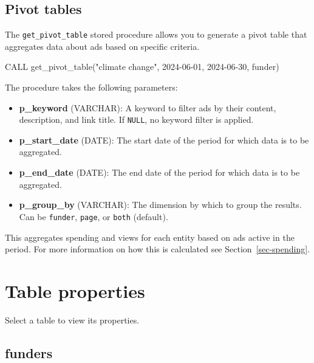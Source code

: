 \documentclass[
  letterpaper,
  DIV=11,
  numbers=noendperiod]{scrreprt}
\newenvironment{Shaded}{\begin{snugshade}}{\end{snugshade}}
\newcommand{\KeywordTok}[1]{\textcolor[rgb]{0.00,0.23,0.31}{#1}}
\newcommand{\NormalTok}[1]{\textcolor[rgb]{0.00,0.23,0.31}{#1}}
\newcommand{\StringTok}[1]{\textcolor[rgb]{0.13,0.47,0.30}{#1}}
\providecommand{\tightlist}{%
  \setlength{\itemsep}{0pt}\setlength{\parskip}{0pt}}\usepackage{longtable,booktabs,array}
\begin{document}
\subsection{Pivot tables}\label{sec-pivot}

The \texttt{get\_pivot\_table} stored procedure allows you to generate a
pivot table that aggregates data about ads based on specific criteria.

\begin{Shaded}
\begin{Highlighting}[]
\KeywordTok{CALL}\NormalTok{ get\_pivot\_table(}\StringTok{\textquotesingle{}"climate change"\textquotesingle{}}\NormalTok{, }\StringTok{\textquotesingle{}2024{-}06{-}01\textquotesingle{}}\NormalTok{, }\StringTok{\textquotesingle{}2024{-}06{-}30\textquotesingle{}}\NormalTok{, }\StringTok{\textquotesingle{}funder\textquotesingle{}}\NormalTok{)}
\end{Highlighting}
\end{Shaded}

The procedure takes the following parameters:

\begin{itemize}
\tightlist
\item
  \textbf{p\_keyword} (VARCHAR): A keyword to filter ads by their
  content, description, and link title. If \texttt{NULL}, no keyword
  filter is applied.
\item
  \textbf{p\_start\_date} (DATE): The start date of the period for which
  data is to be aggregated.
\item
  \textbf{p\_end\_date} (DATE): The end date of the period for which
  data is to be aggregated.
\item
  \textbf{p\_group\_by} (VARCHAR): The dimension by which to group the
  results. Can be \texttt{funder}, \texttt{page}, or \texttt{both}
  (default).
\end{itemize}

This aggregates spending and views for each entity based on ads active
in the period. For more information on how this is calculated see
Section~\ref{sec-spending}.

\section{Table properties}\label{table-properties}

Select a table to view its properties.

\subsection{funders}
\end{document}
